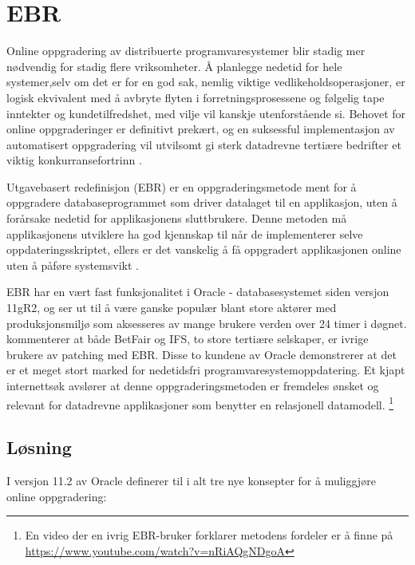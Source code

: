 \section{EBR}

Online oppgradering av distribuerte programvaresystemer blir stadig mer nødvendig for stadig flere vriksomheter. Å planlegge nedetid for hele systemer,selv om det er for en god sak, nemlig viktige vedlikeholdsoperasjoner, er logisk ekvivalent med å avbryte flyten i forretningsprosessene og følgelig tape inntekter og kundetilfredshet, med vilje vil kanskje utenforstående si. Behovet for online oppgraderinger er definitivt prekært, og en suksessful implementasjon av automatisert oppgradering vil utvilsomt gi sterk datadrevne tertiære bedrifter et viktig konkurransefortrinn \citep{choi2009}.

Utgavebasert redefinisjon (EBR) er en oppgraderingsmetode ment for å oppgradere databaseprogrammet som driver datalaget til en applikasjon, uten å forårsake nedetid for applikasjonens sluttbrukere. Denne metoden må applikasjonens utviklere ha god kjennskap til når de implementerer selve oppdateringsskriptet, ellers er det vanskelig å få oppgradert applikasjonen online uten å påføre systemsvikt \citep{choi2009}.

EBR har en vært fast funksjonalitet i Oracle - databasesystemet siden versjon 11gR2, og ser ut til å være ganske populær blant store aktører med produksjonsmiljø som aksesseres av mange brukere verden over 24 timer i døgnet. \cite{choi2009} kommenterer at både BetFair og IFS, to store tertiære selskaper, er ivrige brukere av patching med EBR. Disse to kundene av Oracle demonstrerer at det er et meget stort marked for nedetidsfri programvaresystemoppdatering. Et kjapt internettsøk avslører at denne oppgraderingsmetoden er fremdeles ønsket og relevant for datadrevne applikasjoner som benytter en relasjonell datamodell. \footnote{En video der en ivrig EBR-bruker forklarer metodens fordeler er å finne på \url{https://www.youtube.com/watch?v=nRiAQgNDgoA}}

\subsection{Løsning}
I versjon 11.2 av Oracle definerer \cite{choi2009} til i alt tre nye konsepter for å muliggjøre online oppgradering:

